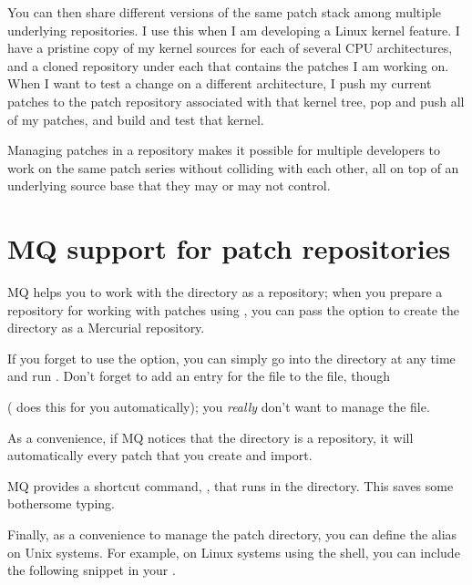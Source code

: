 You can then share different versions of the same patch stack among
multiple underlying repositories.  I use this when I am developing a
Linux kernel feature.  I have a pristine copy of my kernel sources for
each of several CPU architectures, and a cloned repository under each
that contains the patches I am working on.  When I want to test a
change on a different architecture, I push my current patches to the
patch repository associated with that kernel tree, pop and push all of
my patches, and build and test that kernel.

Managing patches in a repository makes it possible for multiple
developers to work on the same patch series without colliding with
each other, all on top of an underlying source base that they may or
may not control.

\section{MQ support for patch repositories}

MQ helps you to work with the  directory as a
repository; when you prepare a repository for working with patches
using , you can pass the  option to
create the  directory as a Mercurial repository.

\begin{note}
  If you forget to use the  option, you can simply go
  into the  directory at any time and run
  .  Don't forget to add an entry for the
   file to the  file, though

  ( does this for you
  automatically); you \emph{really} don't want to manage the
   file.
\end{note}

As a convenience, if MQ notices that the 
directory is a repository, it will automatically  every
patch that you create and import.

MQ provides a shortcut command, , that runs
 in the  directory.  This saves
some bothersome typing.

Finally, as a convenience to manage the patch directory, you can
define the alias  on Unix systems. For example, on Linux
systems using the  shell, you can include the following
snippet in your .

